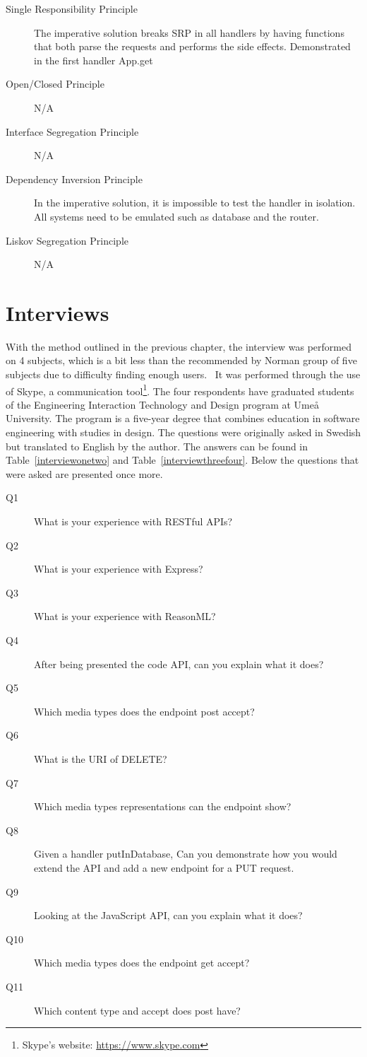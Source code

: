\begin{description}
	\item[Single Responsibility Principle] The imperative solution breaks SRP
in all handlers by having functions that both parse the requests and performs
the side effects. Demonstrated in the first handler App.get
	\item[Open/Closed Principle] N/A
	\item[Interface Segregation Principle] N/A
	\item[Dependency Inversion Principle] In the imperative solution, it is 
impossible to test the handler in isolation. All systems need to be emulated
such as database and the router.
	\item[Liskov Segregation Principle] N/A
\end{description}

\section{Interviews}\label{interviews}

With the method outlined in the previous chapter, the interview was performed
on 4 subjects, which is a bit less than the recommended by Norman group of five
subjects due to difficulty finding enough users.~\cite{jakobnielsen} It was
performed through the use of Skype, a communication tool\footnote{Skype's
website: \url{https://www.skype.com}}. The four respondents have graduated
students of the Engineering Interaction Technology and Design program at Umeå
University. The program is a five-year degree that combines education in
software engineering with studies in design. The questions were originally
asked in Swedish but translated to English by the author. The answers can be
found in Table~\ref{interviewonetwo} and Table~\ref{interviewthreefour}. Below
the questions that were asked are presented once more.

\begin{description}
    \item[Q1] What is your experience with RESTful APIs?
    \item[Q2] What is your experience with Express?
    \item[Q3] What is your experience with ReasonML?
    \item[Q4] After being presented the code API, can you explain what it does?
    \item[Q5] Which media types does the endpoint post accept?
    \item[Q6] What is the URI of DELETE?
    \item[Q7] Which media types representations can the endpoint show?
    \item[Q8] Given a handler putInDatabase, Can you demonstrate how you would
        extend the API and add a new endpoint for a PUT request.
    \item[Q9] Looking at the JavaScript API, can you explain what it does?
    \item[Q10] Which media types does the endpoint get accept?
    \item[Q11] Which content type and accept does post have?
\end{description}


